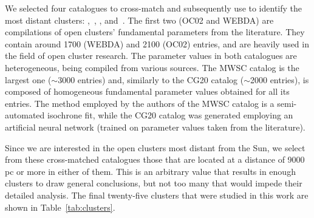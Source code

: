 \documentclass[referee]{aa}
\begin{document}
 We selected four catalogues to cross-match and subsequently use to identify the
 most distant clusters: \citet[][New Catalog of Optically Visible Open Clusters
 and Candidates, hereinafter OC02]{Dias_2002},~\citet[][hereinafter
 WEBDA\footnote{\url{https://webda.physics.muni.cz/}}]{Netopil_2012},
 \citet[][Milky Way Star Clusters Catalog, hereinafter MWSC]{Kharchenko_2012},
 and~\citet[][hereinafter CG20]{Cantat_2020}.
 The first two (OC02 and WEBDA) are compilations of open clusters' fundamental
 parameters from the literature. They contain around 1700 (WEBDA) and 2100 
 (OC02) entries, and are heavily used in the field of open cluster research.
 The parameter values in both catalogues are heterogeneous, being compiled from
 various sources.
 The MWSC catalog is the largest one ($\sim$3000 entries) and, similarly to the
 CG20 catalog ($\sim$2000 entries), is composed of homogeneous fundamental
 parameter values obtained for all its entries.
 The method employed by the authors of the MWSC catalog is a semi-automated
 isochrone fit, while the CG20 catalog was generated employing an artificial
 neural network (trained on parameter values taken from the literature).

 Since we are interested in the open clusters most distant from the Sun, we
 select from these cross-matched catalogues those that are located at a
 distance of 9000 pc or more in either of them. This is an arbitrary value that
 results in enough clusters to draw general conclusions, but not too many that
 would impede their detailed analysis. The final twenty-five clusters that were
 studied in this work are shown in Table~\ref{tab:clusters}.\\
\end{document}
